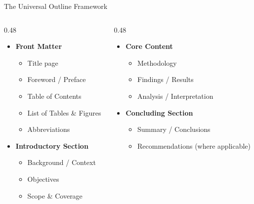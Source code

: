 \documentclass[xcolor={table,dvipsnames},aspectratio=169,11pt]{beamer}
\begin{document}
\begin{frame}{The Universal Outline Framework}
    \begin{columns}[t]
    \begin{column}{0.48\textwidth}
        \begin{itemize}
            \item[\textbf{1.}] \textbf{Front Matter}
            \begin{itemize}
                \item Title page
                \item Foreword / Preface
                \item Table of Contents
                \item List of Tables \& Figures
                \item Abbreviations
            \end{itemize}
            \vskip 0.1cm
            \item[\textbf{2.}] \textbf{Introductory Section}
            \begin{itemize}
                \item Background / Context
                \item Objectives
                \item Scope \& Coverage
            \end{itemize}
        \end{itemize}
    \end{column}
    \begin{column}{0.48\textwidth}
        \begin{itemize}
            \item[\textbf{3.}] \textbf{Core Content}
            \begin{itemize}
                \item Methodology
                \item Findings / Results
                \item Analysis / Interpretation
            \end{itemize}
            \vskip 0.1cm
            \item[\textbf{4.}] \textbf{Concluding Section}
            \begin{itemize}
                \item Summary / Conclusions
                \item Recommendations (where applicable)

\end{itemize}
\end{itemize}
\end{column}
\end{columns}
\end{frame}
\end{document}
